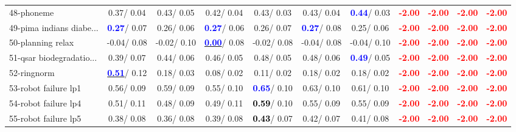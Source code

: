 \begin{table}[h]
\begin{center}
{\begin{tabular}{lc|c|c|c|c|c|c|c|c|c}
48-phoneme &   0.37/  0.04 &   0.43/  0.05 &   0.42/  0.04 &   0.43/  0.03 &   0.43/  0.04 & \textcolor{blue}{\textbf{  0.44}}/  0.03 & \textcolor{red}{\textbf{ -2.00}} & \textcolor{red}{\textbf{ -2.00}} & \textcolor{red}{\textbf{ -2.00}} & \textcolor{red}{\textbf{ -2.00}} \\
49-pima indians diabe... & \textcolor{blue}{\textbf{  0.27}}/  0.07 &   0.26/  0.06 & \textcolor{blue}{\textbf{  0.27}}/  0.06 &   0.26/  0.07 & \textcolor{blue}{\textbf{  0.27}}/  0.08 &   0.25/  0.06 & \textcolor{red}{\textbf{ -2.00}} & \textcolor{red}{\textbf{ -2.00}} & \textcolor{red}{\textbf{ -2.00}} & \textcolor{red}{\textbf{ -2.00}} \\
50-planning relax &  -0.04/  0.08 &  -0.02/  0.10 & \underline{\textcolor{blue}{\textbf{  0.00}}}/  0.08 &  -0.02/  0.08 &  -0.04/  0.08 &  -0.04/  0.10 & \textcolor{red}{\textbf{ -2.00}} & \textcolor{red}{\textbf{ -2.00}} & \textcolor{red}{\textbf{ -2.00}} & \textcolor{red}{\textbf{ -2.00}} \\
51-qsar biodegradatio... &   0.39/  0.07 &   0.44/  0.06 &   0.46/  0.05 &   0.48/  0.05 &   0.48/  0.06 & \textcolor{blue}{\textbf{  0.49}}/  0.05 & \textcolor{red}{\textbf{ -2.00}} & \textcolor{red}{\textbf{ -2.00}} & \textcolor{red}{\textbf{ -2.00}} & \textcolor{red}{\textbf{ -2.00}} \\
52-ringnorm & \underline{\textcolor{blue}{\textbf{  0.51}}}/  0.12 &   0.18/  0.03 &   0.08/  0.02 &   0.11/  0.02 &   0.18/  0.02 &   0.18/  0.02 & \textcolor{red}{\textbf{ -2.00}} & \textcolor{red}{\textbf{ -2.00}} & \textcolor{red}{\textbf{ -2.00}} & \textcolor{red}{\textbf{ -2.00}} \\
53-robot failure lp1 &   0.56/  0.09 &   0.59/  0.09 &   0.55/  0.10 & \textcolor{blue}{\textbf{  0.65}}/  0.10 &   0.63/  0.10 &   0.61/  0.10 & \textcolor{red}{\textbf{ -2.00}} & \textcolor{red}{\textbf{ -2.00}} & \textcolor{red}{\textbf{ -2.00}} & \textcolor{red}{\textbf{ -2.00}} \\ \hline
54-robot failure lp4 &   0.51/  0.11 &   0.48/  0.09 &   0.49/  0.11 & \textcolor{black}{\textbf{  0.59}}/  0.10 &   0.55/  0.09 &   0.55/  0.09 & \textcolor{red}{\textbf{ -2.00}} & \textcolor{red}{\textbf{ -2.00}} & \textcolor{red}{\textbf{ -2.00}} & \textcolor{red}{\textbf{ -2.00}} \\
55-robot failure lp5 &   0.38/  0.08 &   0.36/  0.08 &   0.39/  0.08 & \textcolor{black}{\textbf{  0.43}}/  0.07 &   0.42/  0.07 &   0.41/  0.08 & \textcolor{red}{\textbf{ -2.00}} & \textcolor{red}{\textbf{ -2.00}} & \textcolor{red}{\textbf{ -2.00}} & \textcolor{red}{\textbf{ -2.00}} \\

\end{tabular}}
\end{center}
\end{table}
